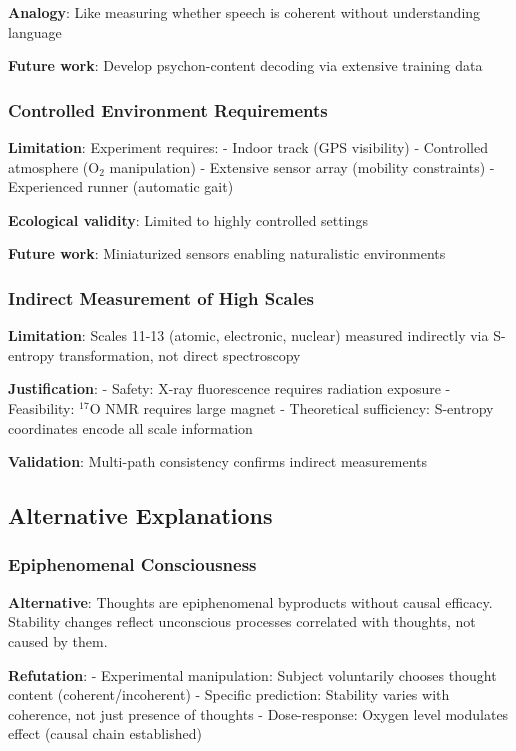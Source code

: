 \documentclass[11pt,onecolumn]{article}
\begin{document}
\textbf{Analogy}: Like measuring whether speech is coherent without understanding language

\textbf{Future work}: Develop psychon-content decoding via extensive training data

\subsubsection{Controlled Environment Requirements}

\textbf{Limitation}: Experiment requires:
- Indoor track (GPS visibility)
- Controlled atmosphere (O$_2$ manipulation)
- Extensive sensor array (mobility constraints)
- Experienced runner (automatic gait)

\textbf{Ecological validity}: Limited to highly controlled settings

\textbf{Future work}: Miniaturized sensors enabling naturalistic environments

\subsubsection{Indirect Measurement of High Scales}

\textbf{Limitation}: Scales 11-13 (atomic, electronic, nuclear) measured indirectly via S-entropy transformation, not direct spectroscopy

\textbf{Justification}:
- Safety: X-ray fluorescence requires radiation exposure
- Feasibility: $^{17}$O NMR requires large magnet
- Theoretical sufficiency: S-entropy coordinates encode all scale information

\textbf{Validation}: Multi-path consistency confirms indirect measurements

\subsection{Alternative Explanations}

\subsubsection{Epiphenomenal Consciousness}

\textbf{Alternative}: Thoughts are epiphenomenal byproducts without causal efficacy. Stability changes reflect unconscious processes correlated with thoughts, not caused by them.

\textbf{Refutation}:
- Experimental manipulation: Subject voluntarily chooses thought content (coherent/incoherent)
- Specific prediction: Stability varies with coherence, not just presence of thoughts
- Dose-response: Oxygen level modulates effect (causal chain established)
\end{document}
